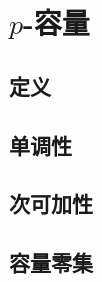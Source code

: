 \section{\texorpdfstring{\(p\)}{p}-容量}
\label{b1:sec:2601}


\subsection{定义}
\label{b1:subsec:260101}

\subsection{单调性}
\label{b1:subsec:260102}

\subsection{次可加性}
\label{b1:subsec:260103}

\subsection{容量零集}
\label{b1:subsec:260104}


